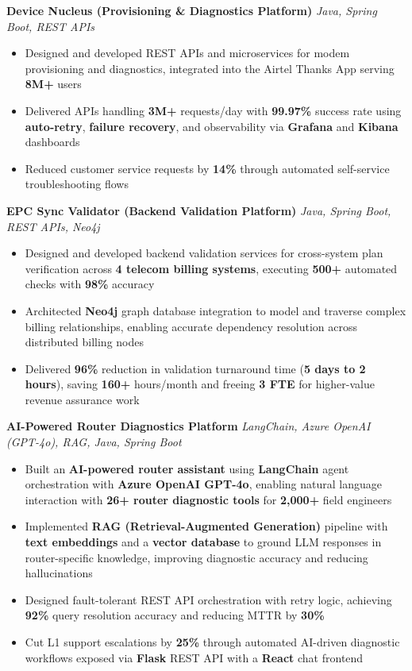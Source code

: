\documentclass[letterpaper,11pt]{article}
\newcommand{\resumeItem}[1]{
  \item\small{{#1 \vspace{-2pt}}}
}
\newcommand{\resumeItemListStart}{\begin{itemize}}
\newcommand{\resumeItemListEnd}{\end{itemize}\vspace{-5pt}}
\begin{document}
      \vspace{4pt}
      \textbf{\small Device Nucleus (Provisioning \& Diagnostics Platform)} \hfill \textit{\small Java, Spring Boot, REST APIs} \\
      \vspace{-2pt}
      \resumeItemListStart
        \resumeItem{Designed and developed REST APIs and microservices for modem provisioning and diagnostics, integrated into the Airtel Thanks App serving \textbf{8M+} users}
        \resumeItem{Delivered APIs handling \textbf{3M+} requests/day with \textbf{99.97\%} success rate using \textbf{auto-retry}, \textbf{failure recovery}, and observability via \textbf{Grafana} and \textbf{Kibana} dashboards}
        \resumeItem{Reduced customer service requests by \textbf{14\%} through automated self-service troubleshooting flows}
      \resumeItemListEnd

      \vspace{4pt}
      \textbf{\small EPC Sync Validator (Backend Validation Platform)} \hfill \textit{\small Java, Spring Boot, REST APIs, Neo4j} \\
      \vspace{-2pt}
      \resumeItemListStart
        \resumeItem{Designed and developed backend validation services for cross-system plan verification across \textbf{4 telecom billing systems}, executing \textbf{500+} automated checks with \textbf{98\%} accuracy}
        \resumeItem{Architected \textbf{Neo4j} graph database integration to model and traverse complex billing relationships, enabling accurate dependency resolution across distributed billing nodes}
        \resumeItem{Delivered \textbf{96\%} reduction in validation turnaround time (\textbf{5 days to 2 hours}), saving \textbf{160+} hours/month and freeing \textbf{3 FTE} for higher-value revenue assurance work}
      \resumeItemListEnd

      \vspace{4pt}
      \textbf{\small AI-Powered Router Diagnostics Platform} \hfill \textit{\small LangChain, Azure OpenAI (GPT-4o), RAG, Java, Spring Boot} \\
      \vspace{-2pt}
      \resumeItemListStart
        \resumeItem{Built an \textbf{AI-powered router assistant} using \textbf{LangChain} agent orchestration with \textbf{Azure OpenAI GPT-4o}, enabling natural language interaction with \textbf{26+ router diagnostic tools} for \textbf{2,000+} field engineers}
        \resumeItem{Implemented \textbf{RAG (Retrieval-Augmented Generation)} pipeline with \textbf{text embeddings} and a \textbf{vector database} to ground LLM responses in router-specific knowledge, improving diagnostic accuracy and reducing hallucinations}
        \resumeItem{Designed fault-tolerant REST API orchestration with retry logic, achieving \textbf{92\%} query resolution accuracy and reducing MTTR by \textbf{30\%}}
        \resumeItem{Cut L1 support escalations by \textbf{25\%} through automated AI-driven diagnostic workflows exposed via \textbf{Flask} REST API with a \textbf{React} chat frontend}
      \resumeItemListEnd
\end{document}
